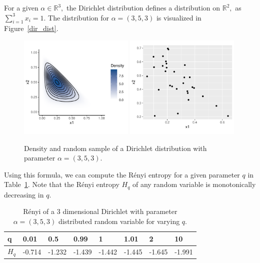 \documentclass[12pt, twoside]{article}
\newcommand{\R}{\mathbb{R}}
\newcommand{\1}{\mathbb{1}}
\begin{document}
For a given $\alpha \in \R^3,$ the Dirichlet distribution defines a distribution on $\R^2,$ as $\sum_{i = 1}^3 x_i = 1$. The distribution for $\alpha = (3, 5, 3)$ is visualized in Figure~\ref{dir_dist}.
\begin{figure}[ht]
    \centering
    \includegraphics[width=0.49\textwidth]{plots/dirichlet_density.pdf}
    \includegraphics[width=0.49\textwidth]{plots/dirichlet_sample.pdf}
    \caption{Density and random sample of a Dirichlet distribution with parameter $\alpha = (3, 5, 3)$.}
    \label{fig:dir_dist}
\end{figure}


Using this formula, we can compute the R\'enyi entropy for a given parameter $q$ in Table~\ref{tab:renyi_ent}. Note that the R\'enyi entropy $H_q$ of any random variable is monotonically decreasing in $q$.

\begin{table}[]
\caption{R\'enyi of a 3 dimensional Dirichlet with parameter $\alpha = (3, 5, 3)$ distributed random variable for varying $q$. }
\begin{tabular}{l|lllllll}
q    & 0.01   & 0.5    & 0.99                       & 1      & 1.01   & 2      & 10     \\ \hline
$H_q$ & -0.714 & -1.232 & \multicolumn{1}{r}{-1.439} & -1.442 & -1.445 & -1.645 & -1.991
\end{tabular}
\label{tab:renyi_ent}
\end{table}
\end{document}
